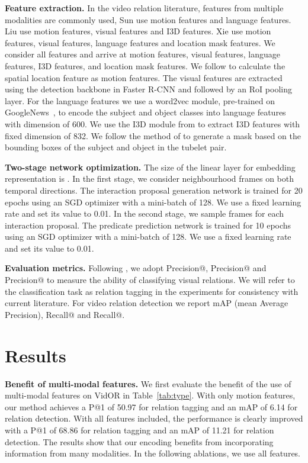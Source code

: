 \documentclass[10pt,twocolumn,letterpaper]{article}
\begin{document}
\textbf{Feature extraction.}
In the video relation literature, features from multiple modalities are commonly used, \eg
Sun \etal \cite{sun2019video} use motion features and language features. Liu \etal \cite{liu2020beyond} use motion features, visual features and I3D features. Xie \etal \cite{xie2020video} use motion features, visual features, language features and location mask features. 
We consider all features and arrive at motion features, visual features, language features, I3D features, and location mask features. 
We follow \cite{sun2019video} to calculate the spatial location feature as motion features. The visual features are extracted using the detection backbone in Faster R-CNN and followed by an RoI pooling layer. For the language features we use a word2vec module, pre-trained on GoogleNews~\cite{mikolov2013efficient}, to encode the subject and object classes into language features with dimension of 600. We use the I3D module from \cite{carreira2017quo} to extract I3D features with fixed dimension of 832. We follow the method of \cite{xie2020video} to generate a mask based on the bounding boxes of the subject and object in the tubelet pair.


\textbf{Two-stage network optimization.} The size of the linear layer for embedding representation is . In the first stage, we consider  neighbourhood frames on both temporal directions.
The interaction proposal generation network is trained for 20 epochs using an SGD optimizer with a mini-batch of 128. We use a fixed learning rate and set its value to 0.01. 
In the second stage, we sample  frames for each interaction proposal. The predicate prediction network is trained for 10 epochs using an SGD optimizer with a mini-batch of 128. We use a fixed learning rate and set its value to 0.01. 


\textbf{Evaluation metrics.} Following \cite{shang2017video},
we adopt Precision@, Precision@ and Precision@ to measure the ability of classifying visual relations. We will refer to the classification task as relation tagging in the experiments for consistency with current literature. For video relation detection we report mAP (mean Average Precision), Recall@ and Recall@.


\section{Results}


\textbf{Benefit of multi-modal features.}
We first evaluate the benefit of the use of multi-modal features on VidOR in Table~\ref{tab:type}. With only motion features, our method achieves a P@1 of 50.97 for relation tagging and an mAP of 6.14 for relation detection. With all features included, the performance is clearly improved with a P@1 of 68.86 for relation tagging and an mAP of 11.21 for relation detection.
The results show that our encoding benefits from incorporating information from many modalities. In the following ablations, we use all features.
\end{document}
